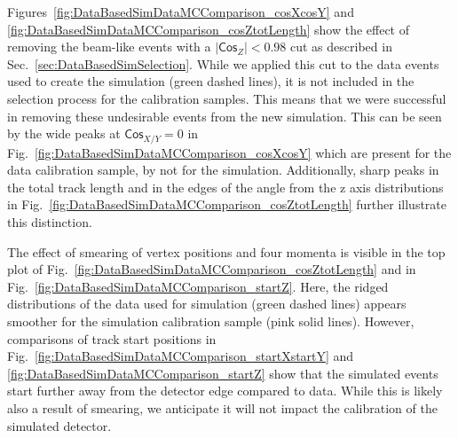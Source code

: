 Figures~\ref{fig:DataBasedSimDataMCComparison_cosXcosY} and \ref{fig:DataBasedSimDataMCComparison_cosZtotLength} show the effect of removing the beam-like events with a $\left|\textsf{Cos}_Z\right|<0.98$ cut as described in Sec.~\ref{sec:DataBasedSimSelection}.  While we applied this cut to the data events used to create the simulation (green dashed lines), it is not included in the selection process for the calibration samples. This means that we were successful in removing these undesirable events from the new simulation. This can be seen by the wide peaks at $\textsf{Cos}_{X/Y}=0$ in Fig.~\ref{fig:DataBasedSimDataMCComparison_cosXcosY} which are present for the data calibration sample, by not for the simulation. Additionally, sharp peaks in the total track length and in the edges of the angle from the z axis distributions in Fig.~\ref{fig:DataBasedSimDataMCComparison_cosZtotLength} further illustrate this distinction.

The effect of smearing of vertex positions and four momenta is visible in the top plot of Fig.~\ref{fig:DataBasedSimDataMCComparison_cosZtotLength} and in Fig.~\ref{fig:DataBasedSimDataMCComparison_startZ}. Here, the ridged distributions of the data used for simulation (green dashed lines) appears smoother for the simulation calibration sample (pink solid lines). However, comparisons of track start positions in Fig.~\ref{fig:DataBasedSimDataMCComparison_startXstartY} and \ref{fig:DataBasedSimDataMCComparison_startZ} show that the simulated events start further away from the detector edge compared to data. While this is likely also a result of smearing, we anticipate it will not impact the calibration of the simulated detector.

